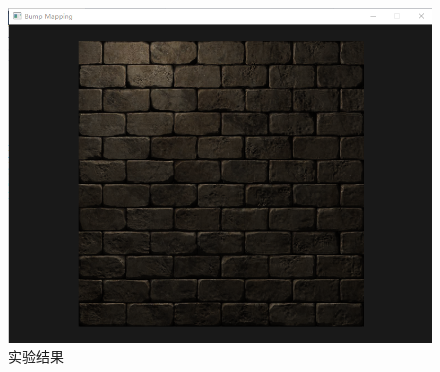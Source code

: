 \documentclass[11pt,UTF8]{article}
\begin{document}
	\begin{figure}[H]
		\centering
		\includegraphics[width=\textwidth]{result.png}
		\caption{实验结果}\label{result}
	\end{figure}

\newpage
\end{document}

